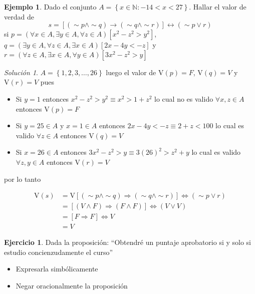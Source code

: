 \documentclass[
  16pt,
]{krantz}
\providecommand{\tightlist}{%
  \setlength{\itemsep}{0pt}\setlength{\parskip}{0pt}}
\theoremstyle{definition}
\theoremstyle{definition}
\newtheorem{example}{Ejemplo}[chapter]
\theoremstyle{definition}
\newtheorem{exercise}{Ejercicio}[chapter]
\theoremstyle{definition}
\theoremstyle{remark}
\newtheorem*{solution}{Solución}
\begin{document}
\begin{example}
\protect\hypertarget{exm:unnamed-chunk-3}{}{\label{exm:unnamed-chunk-3} }Dado el conjunto \(A=\left\{x\in\mathbb{N}:-14<x<27\right\}\). Hallar el valor de verdad de \[
s=[(\sim p\wedge \sim q)\rightarrow(\sim q\wedge \sim r)]\leftrightarrow(\sim p\vee r) 
\] si \(p=(\forall x\in A, \exists y\in A, \forall z\in A)[x^2-z^2>y^2]\), \(q=(\exists y\in A, \forall z\in A, \exists x \in A)[2x-4y<-z]\) y \(r=(\forall z\in A, \exists x\in A, \forall y \in A)[3x^2-z^2>y]\)
\end{example}

\begin{solution}
\iffalse{} {Solución. } \fi{}\(A=\left\{1,2,3,\ldots,26\right\}\) luego el valor de \(\text{V}(p)=F\), \(\text{V}(q)=V\) y \(\text{V}(r)=V\) pues

\begin{itemize}
\tightlist
\item
  Si \(y=1\) entonces \(x^2-z^2>y^2\equiv x^2>1+z^2\) lo cual no es valido \(\forall x,z\in A\) entonces \(\text{V}(p)=F\)
\item
  Si \(y=25\in A\) y \(x=1\in A\) entonces \(2x-4y<-z\equiv 2+z<100\) lo cual es valido \(\forall z\in A\) entonces \(\text{V}(q)=V\)
\item
  Si \(x=26\in A\) entonces \(3x^2-z^2>y\equiv3(26)^2>z^2+y\) lo cual es valido \(\forall z,y\in A\) entonces \(\text{V}(r)=V\)
\end{itemize}

por lo tanto

\[
\begin{aligned}
\text{V}(s)&=\text{V}[(\sim p\wedge \sim q)\Longrightarrow(\sim q\wedge \sim r)]\Longleftrightarrow(\sim p\vee r)\\
&=[(V\wedge F)\Longrightarrow(F\wedge F)]\Longleftrightarrow(V\vee V)\\
&=[F\Longrightarrow F]\Longleftrightarrow V\\
&=V
\end{aligned}
\]
\end{solution}

\begin{exercise}
\protect\hypertarget{exr:unnamed-chunk-5}{}{\label{exr:unnamed-chunk-5} }Dada la proposición: ``Obtendré un puntaje aprobatorio si y solo si estudio concienzudamente el curso''

\begin{itemize}
\tightlist
\item
  Expresarla simbólicamente
\item
  Negar oracionalmente la proposición
\end{itemize}
\end{exercise}
\end{document}
